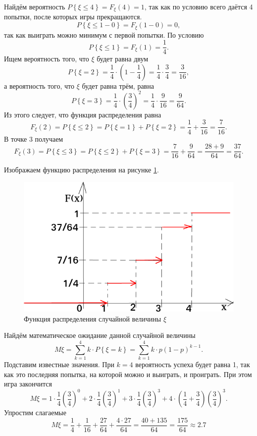 Найдём вероятность $P \left\{ \xi \leq 4 \right\} = F_{ \xi } \left( 4 \right) = 1$, так как по условию всего даётся 4 попытки, после которых игры прекращаются.
$$P \left\{ \xi \leq 1 - 0 \right\} =
F_{ \xi } \left( 1 - 0 \right) =
0,$$
так как выиграть можно минимум с первой попытки.
По условию
$$P \left\{ \xi \leq 1 \right\} =
F_{ \xi } \left( 1 \right) =
\frac{1}{4}.$$
Ищем вероятность того, что $ \xi $ будет равна двум
$$P \left\{ \xi = 2 \right\} =
\frac{1}{4} \cdot \left( 1 - \frac{1}{4} \right) =
\frac{1}{4} \cdot \frac{3}{4} =
\frac{3}{16},$$
а вероятность того, что $ \xi $ будет равна трём, равна
$$P \left\{ \xi = 3 \right\} =
\frac{1}{4} \cdot \left( \frac{3}{4} \right)^2 =
\frac{1}{4} \cdot \frac{9}{16} =
\frac{9}{64}.$$
Из этого следует, что функция распределения равна
$$F_{ \xi } \left( 2 \right) =
P \left\{ \xi \leq 2 \right\} =
P \left\{ \xi = 1 \right\} + P \left\{ \xi = 2 \right\} =
\frac{1}{4} + \frac{3}{16} =
\frac{7}{16}.$$
В точке 3 получаем
$$F_{ \xi } \left( 3 \right) =
P \left\{ \xi \leq 3 \right\} =
P \left\{ \xi \leq 2 \right\} + P \left\{ \xi = 3 \right\} =
\frac{7}{16} + \frac{9}{64} =
\frac{28+9}{64} =
\frac{37}{64}.$$

Изображаем функцию распределения на рисунке \ref{fig:1212}.

\begin{figure}[h!]
  \centering
  \includegraphics[width=1\textwidth]{./pictures/12_12.png}
  \caption{Функция распределения случайной величины $ \xi $}
  \label{fig:1212}
\end{figure}

Найдём математическое ожидание данной случайной величины
$$M \xi =
\sum \limits_{k=1}^4 k \cdot P \left\{ \xi = k \right\} =
\sum \limits_{k=1}^4 k \cdot p \left( 1-p \right)^{k-1}.$$
Подставим известные значения.
При $k = 4$ вероятность успеха будет равна 1, так как это последняя попытка, на которой можно и выиграть, и проиграть.
При этом игра закончится
$$M \xi =
1 \cdot \frac{1}{4} \left( \frac{3}{4} \right)^0 +
2 \cdot \frac{1}{4} \left( \frac{3}{4} \right)^1 +
3 \cdot \frac{1}{4} \left( \frac{3}{4} \right)^3 +
4 \cdot \left( \frac{1}{4} + \frac{3}{4} \right) \left( \frac{3}{4} \right)^3.$$
Упростим слагаемые
$$M \xi =
\frac{1}{4} + \frac{1}{16} + \frac{27}{64} + \frac{4 \cdot 27}{64} =
\frac{40+135}{64} =
\frac{175}{64} \approx
2.7$$

